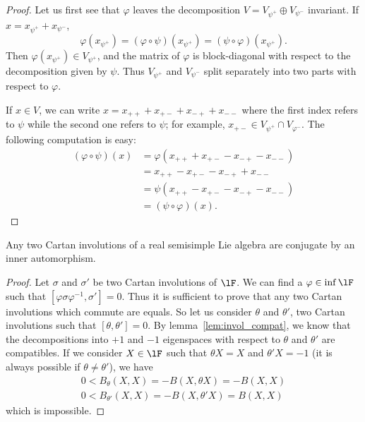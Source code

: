 \begin{proof}
Let us first see that $\varphi$ leaves the decomposition $V=V_{\psi^+}\oplus V_{\psi^-}$ invariant. If $x=x_{\psi^+}+x_{\psi^-}$,
\[
   \varphi(x_{\psi^+})=(\varphi\circ\psi)(x_{\psi^+})=(\psi\circ\varphi)(x_{\psi^+}).
\]
Then $\varphi(x_{\psi^+})\in V_{\psi^+}$, and the matrix of $\varphi$ is block-diagonal with respect to the decomposition given by $\psi$. Thus $V_{\psi^+}$ and $V_{\psi^-}$ split separately into two parts with respect to $\varphi$.

If $x\in V$, we can write $x=x_{++}+x_{+-}+x_{-+}+x_{--}$ where the first index refers to $\psi$ while the second one refers to $\psi$; for example, $x_{+-}\in V_{\psi^+}\cap V_{\varphi^-}$. The following computation is easy:
\begin{equation}
\begin{split}
(\varphi\circ\psi)(x)&=\varphi(x_{++}+x_{+-}-x_{-+}-x_{--})\\
                 &=x_{++}-x_{+-}-x_{-+}+x_{--}\\
         &=\psi(x_{++}-x_{+-}-x_{-+}-x_{--})\\
         &=(\psi\circ\varphi)(x).
\end{split}
\end{equation}
\end{proof}

\begin{corollary}\label{cor:Cartan_conj_inner}
    Any two Cartan involutions of a real semisimple Lie algebra are conjugate by an inner automorphism. 
\end{corollary}

\begin{proof}
Let $\sigma$ and $\sigma'$ be two Cartan involutions of $\lF$. We can find a $\varphi\in\inf\lF$ such that $[\varphi\sigma\varphi^{-1},\sigma']=0$. Thus it is sufficient to prove that any two Cartan involutions which commute are equals. So let us consider $\theta$ and $\theta'$, two Cartan involutions such that $[\theta,\theta']=0$. By lemma~\ref{lem:invol_compat}, we know that the decompositions into $+1$ and $-1$  eigenspaces with respect to $\theta$ and $\theta'$ are compatibles. If we consider $X\in\lF$ such that $\theta X=X$ and $\theta' X=-1$ (it is always possible if $\theta\neq\theta'$), we have
\[
\begin{split}
  0<B_{\theta}(X,X)=-B(X,\theta X)=-B(X,X)\\
  0<B_{\theta'}(X,X)=-B(X,\theta' X)=B(X,X)
\end{split}
\]
which is impossible.
\end{proof}

